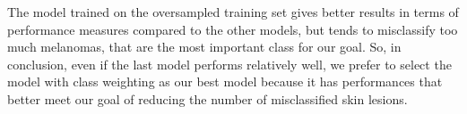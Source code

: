 		The model trained on the oversampled training set gives better results in terms of performance measures compared to the other models, but tends to misclassify too much melanomas, that are the most important class for our goal.
		So, in conclusion, even if the last model performs relatively well, we prefer to select the model with class weighting as our best model because it has performances that better meet our goal of reducing the number of misclassified skin lesions.
		
		
		
		
		